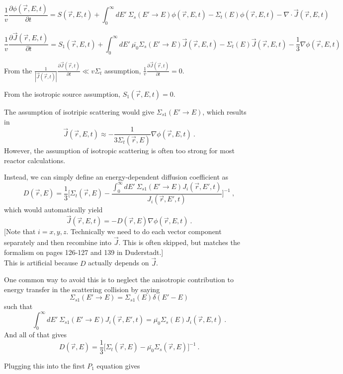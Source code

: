 \documentclass[12pt]{article}
\newcommand{\rvec}{\ensuremath{\vec{r}}}
\begin{document}
\begin{equation*}
\frac{1}{v}\frac{\partial\phi(\rvec,E,t)}{\partial t} = S(\rvec,E,t) + 
\int^{\infty}_0dE'\:\Sigma_s(E'\rightarrow E)\phi(\rvec,E,t) - 
\Sigma_t(E)\phi(\rvec,E,t) - \nabla\cdot\vec{J}(\rvec,E,t)
\end{equation*}

\begin{equation*}
\frac{1}{v}\frac{\partial \vec{J}(\rvec,E,t)}{\partial t} = S_1(\rvec,E,t) + 
\int^{\infty}_0dE'\:\bar{\mu_0}\Sigma_s(E'\rightarrow E)\vec{J}(\rvec,E,t) - 
\Sigma_t(E)\vec{J}(\rvec,E,t) - \frac{1}{3}\nabla\phi(\rvec,E,t)
\end{equation*}

From the $\frac{1}{|\vec{J}(\rvec,t)|}\frac{\partial\vec{J}(\rvec,t)}{\partial t}\ll v\Sigma_t$ 
assumption, $\frac{1}{v}\frac{\partial\vec{J}(\rvec,t)}{\partial t} = 0$.

From the isotropic source assumption, $S_1(\rvec,E,t) = 0$.

The assumption of isotripic scattering would give $\Sigma_{s1}(E' \rightarrow E)$, which results in
\[\vec{J}(\vec{r}, E, t) \approx - \frac{1}{3 \Sigma_t(\vec{r}, E)}\nabla \phi(\vec{r}, E, t)\:. \]
However, the assumption of isotropic scattering is often too strong for most reactor calculations.

Instead, we can simply define an energy-dependent diffusion coefficient as
\[D(\vec{r}, E) = \frac{1}{3} \biggl[ \Sigma_t(\vec{r}, E) - \frac{\int_0^{\infty} dE' \: \Sigma_{s1}(E' \rightarrow E)J_i(\vec{r}, E', t)}{J_i(\vec{r}, E', t)}\biggr]^{-1}\:,\]
which would automatically yield
\[\vec{J}(\vec{r}, E, t) = -D(\vec{r},E)\nabla \phi(\vec{r}, E, t)\:.\]
[Note that $i = x,y,z$. Technically we need to do each vector component separately and then recombine into $\vec{J}$. This is often skipped, but matches the formalism on pages 126-127 and 139 in Duderstadt.]\\
This is artificial because $D$ actually depends on $\vec{J}$.

One common way to avoid this is to neglect the anisotropic contribution to energy transfer in the scattering collision by saying
\[\Sigma_{s1}(E' \rightarrow E) = \Sigma_{s1}(E) \delta(E' - E)\]
such that
\[\int_0^{\infty} dE' \: \Sigma_{s1}(E' \rightarrow E)J_i(\vec{r}, E', t) = \bar{\mu_0} \Sigma_s(E) J_i(\vec{r}, E, t)\:.\]
And all of that gives
\[D(\vec{r}, E) = \frac{1}{3} \bigl[\Sigma_t(\vec{r}, E) - \bar{\mu_0} \Sigma_s(\vec{r}, E) \bigr]^{-1}\:.\]

Plugging this into the first $P_1$ equation gives
\end{document}
